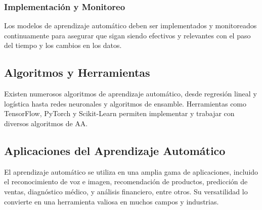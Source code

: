 \subsubsection{Implementación y Monitoreo}
Los modelos de aprendizaje automático deben ser implementados y monitoreados continuamente para asegurar que sigan siendo efectivos y relevantes con el paso del tiempo y los cambios en los datos.

\subsection{Algoritmos y Herramientas}

Existen numerosos algoritmos de aprendizaje automático, desde regresión lineal y logística hasta redes neuronales y algoritmos de ensamble. Herramientas como TensorFlow, PyTorch y Scikit-Learn permiten implementar y trabajar con diversos algoritmos de AA.

\subsection{Aplicaciones del Aprendizaje Automático}

El aprendizaje automático se utiliza en una amplia gama de aplicaciones, incluido el reconocimiento de voz e imagen, recomendación de productos, predicción de ventas, diagnóstico médico, y análisis financiero, entre otros. Su versatilidad lo convierte en una herramienta valiosa en muchos campos y industrias.